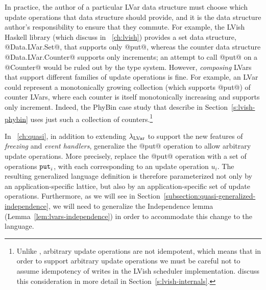 In practice, the author of a particular LVar data structure must
choose which update operations that data structure should provide, and
it is the data structure author's responsibility to ensure that they
commute.  For example, the LVish Haskell library (which  discuss in
~\ref{ch:lvish}) provides a set data structure,
@Data.LVar.Set@, that supports only @put@, whereas the counter data
structure @Data.LVar.Counter@ supports only increments; an attempt to
call @put@ on a @Counter@ would be ruled out by the type system.
However, \emph{composing} LVars that support different families of
update operations is fine.  For example, an LVar could represent a
monotonically growing collection (which supports @put@) of counter
LVars, where each counter is itself monotonically increasing and
supports only increment.  Indeed, the PhyBin case study that 
describe in Section~\ref{s:lvish-phybin} uses just such a collection
of counters.\footnote{Unlike , arbitrary update operations are
  not idempotent, which means that in order to support arbitrary
  update operations we must be careful not to assume idempotency of
  writes in the LVish scheduler implementation.   discuss this
  consideration in more detail in Section~\ref{s:lvish-internals}.}

In ~\ref{ch:quasi}, in addition to extending $\lambda_{\textrm{LVar}}$ to
support the new features of \emph{freezing} and \emph{event handlers},
 generalize the @put@ operation to allow arbitrary update operations.
More precisely,  replace the @put@ operation with a set of operations
$\mbox{\texttt{put}}_i$, with each corresponding to an update operation $u_i$.  The
resulting generalized language definition is therefore parameterized
not only by an application-specific lattice, but also by an
application-specific set of update operations.  Furthermore, as we
will see in Section~\ref{subsection:quasi-generalized-independence},
we will need to generalize the Independence lemma
(Lemma~\ref{lem:lvars-independence}) in order to accommodate this
change to the language.


